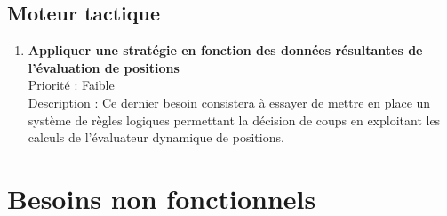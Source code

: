 		\subsection{Moteur tactique}

			\begin{enumerate}

				\item \textbf{Appliquer une stratégie en fonction des données résultantes de l'évaluation de positions} 
				\\[0.7\baselineskip]
				Priorité : Faible 
				\\[0.7\baselineskip]
				Description : Ce dernier besoin consistera à essayer de mettre en place un système de règles logiques permettant la décision de coups en exploitant les 
				calculs de l'évaluateur dynamique de positions. 
				
			\end{enumerate}
	

	\section{Besoins non fonctionnels}